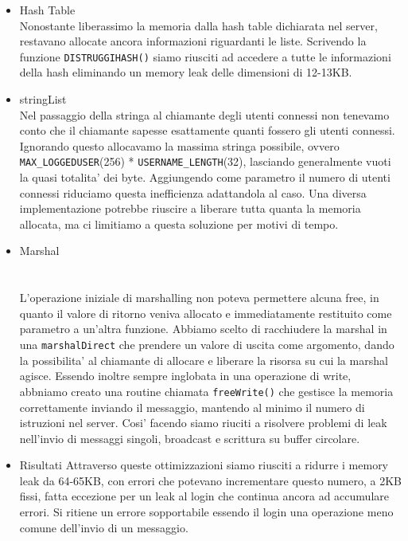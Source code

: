 \documentclass[a4paper, 11pt]{article} %
\begin{document}
\begin{itemize}
	\item Hash Table
	\\
	Nonostante liberassimo la memoria dalla hash table dichiarata nel server, restavano allocate ancora informazioni riguardanti le liste. Scrivendo la funzione \texttt{DISTRUGGIHASH()} siamo riusciti ad accedere a tutte le informazioni della hash eliminando un memory leak delle dimensioni di 12-13KB.\\
	\item stringList
	\\
	Nel passaggio della stringa al chiamante degli utenti connessi non tenevamo conto che il chiamante sapesse esattamente quanti fossero gli utenti connessi. Ignorando questo allocavamo la massima stringa possibile, ovvero \texttt{MAX_LOGGEDUSER}(256) * \texttt{USERNAME_LENGTH}(32), lasciando generalmente vuoti la quasi totalita' dei byte. Aggiungendo come parametro il numero di utenti connessi riduciamo questa inefficienza adattandola al caso. Una diversa implementazione potrebbe riuscire a liberare tutta quanta la memoria allocata, ma ci limitiamo a questa soluzione per motivi di tempo.
	\item Marshal
	\\
	\\
	\\
	L'operazione iniziale di marshalling non poteva permettere alcuna free, in quanto il valore di ritorno veniva allocato e immediatamente restituito come parametro a un'altra funzione. Abbiamo scelto di racchiudere la marshal in una \texttt{marshalDirect} che prendere un valore di uscita come argomento, dando la possibilita' al chiamante di allocare e liberare la risorsa su cui la marshal agisce. Essendo inoltre sempre inglobata in una operazione di write, abbniamo creato una routine chiamata \texttt{freeWrite()} che gestisce la memoria correttamente inviando il messaggio, mantendo al minimo il numero di istruzioni nel server. Cosi' facendo siamo riuciti a risolvere problemi di leak nell'invio di messaggi singoli, broadcast e scrittura su buffer circolare.
	\item Risultati
	Attraverso queste ottimizzazioni siamo riusciti a ridurre i memory leak da 64-65KB, con errori che potevano incrementare questo numero, a 2KB fissi, fatta eccezione per un leak al login che continua ancora ad accumulare errori. Si ritiene un errore sopportabile essendo il login una operazione meno comune dell'invio di un messaggio.
	\\
\end{itemize}
\end{document}
